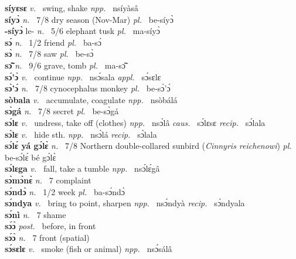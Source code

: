 {\bfseries síyɛsɛ}  {\itshape v.~} swing, shake   {\itshape npp.~} nsíyàsâ  \\ 
{\bfseries síyɔ̀}  {\itshape n.~} 7/8 dry season (Nov-Mar) {\itshape pl.~} be-síyɔ̀    \\ 
{\bfseries -síyɔ̀} le- {\itshape n.~} 5/6 elephant tusk {\itshape pl.~} ma-síyɔ̀    \\ 
{\bfseries sɔ́}  {\itshape n.~} 1/2 friend {\itshape pl.~} ba-sɔ́    \\ 
{\bfseries sɔ̀}  {\itshape n.~} 7/8 saw {\itshape pl.~} be-sɔ̀    \\ 
{\bfseries sɔ̃̂}  {\itshape n.~} 9/6 grave, tomb {\itshape pl.~} ma-sɔ̃̂    \\ 
{\bfseries sɔ́'ɔ̀}  {\itshape v.~} continue   {\itshape npp.~} nsɔ́sala {\itshape appl.~} sɔ́sɛlɛ   \\ 
{\bfseries sɔ̀'ɔ́}  {\itshape n.~} 7/8 cynocephalus monkey {\itshape pl.~} be-sɔ̀'ɔ́    \\ 
{\bfseries sòbala}  {\itshape v.~} accumulate, coagulate   {\itshape npp.~} nsòbálá  \\ 
{\bfseries sɔ̀gá}  {\itshape n.~} 7/8 secret {\itshape pl.~} be-sɔ̀gá    \\ 
{\bfseries sɔ́lɛ}  {\itshape v.~} undress, take off (clothes)   {\itshape npp.~} nsɔ́lâ {\itshape caus.~} sɔ́lɛsɛ {\itshape recip.~} sɔ́lala  \\ 
{\bfseries sɔ̀lɛ}  {\itshape v.~} hide sth.   {\itshape npp.~} nsɔ̀lá {\itshape recip.~} sɔ̀lala  \\ 
{\bfseries sɔ́lɛ́ yá gɔ́lɛ̀}  {\itshape n.~} 7/8 Northern double-collared sunbird ({\itshape Cinnyris reichenowi}) {\itshape pl.~} be-sɔ́lɛ́ bé gɔ́lɛ̀    \\ 
{\bfseries sɔ́lɛga}  {\itshape v.~} fall, take a tumble   {\itshape npp.~} nsɔ́lɛ́gâ  \\ 
{\bfseries sɔ̀mɔ̀nɛ̀}  {\itshape n.~} 7 complaint    \\ 
{\bfseries sɔ́ndɔ̀}  {\itshape n.~} 1/2 week {\itshape pl.~} ba-sɔ́ndɔ̀    \\ 
{\bfseries sɔ́ndya}  {\itshape v.~} bring to point, sharpen   {\itshape npp.~} nsɔ́ndyà {\itshape recip.~} sɔ́ndyala  \\ 
{\bfseries sɔ́nì}  {\itshape n.~} 7 shame    \\ 
{\bfseries sɔ́ɔ̀}  {\itshape post.~} before, in front    \\ 
{\bfseries sɔ́ɔ̀}  {\itshape n.~} 7 front (spatial)    \\ 
{\bfseries sɔ́sɛlɛ}  {\itshape v.~} smoke (fish or animal)   {\itshape npp.~} nsɔ́sálâ  \\ 
